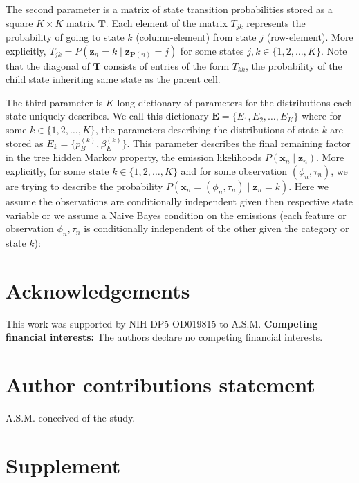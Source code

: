 \documentclass[11pt]{article}
\newcommand{\beginsupplement}{\cleardoublepage%
      \setcounter{table}{0}
      \renewcommand{\thetable}{S\arabic{table}}%
      \setcounter{figure}{0}
      \renewcommand{\thefigure}{S\arabic{figure}}%
}
\begin{document}
The second parameter is a matrix of state transition probabilities
stored as a square \(K\times K\) matrix \(\bm{T}\). Each element of the
matrix \(T_{jk}\) represents the probability of going to state \(k\)
(column-element) from state \(j\) (row-element). More explicitly,
\(T_{jk} = {P}(\bm{z}_{n}=k\mid\bm{z}_{\bm{P}(n)}=j)\) for some states
\(j,k \in \{1,2,\ldots,K\}\). Note that the diagonal of \(\bm{T}\)
consists of entries of the form \(T_{kk}\), the probability of the child
state inheriting same state as the parent cell.

The third parameter is \(K\)-long dictionary of parameters for the
distributions each state uniquely describes. We call this dictionary
\(\bm{E}=\{E_{1},E_{2},\ldots,E_{K}\}\) where for some
\(k\in\{1,2,\ldots,K\}\), the parameters describing the distributions of
state \(k\) are stored as \(E_{k}=\{p_{B}^{(k)},\beta_{E}^{(k)}\}\).
This parameter describes the final remaining factor in the tree hidden
Markov property, the emission likelihoods
\({P}(\bm{x}_{n}\mid\bm{z}_{n})\). More explicitly, for some state
\(k\in\{1,2,\ldots,K\}\) and for some observation
\((\phi_{n}, \tau_{n})\), we are trying to describe the probability
\({P}(\bm{x}_{n}=(\phi_{n}, \tau_{n})\mid\bm{z}_{n}=k)\). Here we assume
the observations are conditionally independent given then respective
state variable or we assume a Naive Bayes condition on the emissions
(each feature or observation \(\phi_{n},\tau_{n}\) is conditionally
independent of the other given the category or state \(k\)):

\hypertarget{acknowledgements}{%
\section{Acknowledgements}\label{acknowledgements}}

This work was supported by NIH DP5-OD019815 to A.S.M. \textbf{Competing
financial interests:} The authors declare no competing financial
interests.

\hypertarget{author-contributions-statement}{%
\section{Author contributions
statement}\label{author-contributions-statement}}

A.S.M. conceived of the study.

\beginsupplement

\hypertarget{supplement}{%
\section{Supplement}\label{supplement}}
\end{document}
